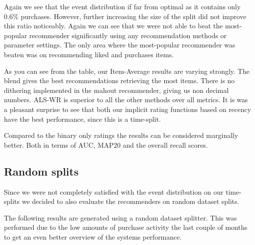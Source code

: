
Again we see that the event distribution if far from optimal as it contains only 0.6\% purchases. However, further increasing the size of the split did not improve this ratio noticeably.
Again we can see that we were not able to beat the most-popular recommender significantly using any recommendation methods or parameter settings. The only area where the most-popular recommender
was beaten was on recommending liked and purchases items.


As you can see from the table, our Item-Average results are varying strongly. The blend gives the best recommendations retrieving the most items.
There is no dithering implemented in the mahout recommender, giving us non decimal numbers. ALS-WR is superior to all the other methods over all metrics.
It is was a pleasant surprise to see that both our implicit rating functions based on recency have the best performance, since this is a time-split.

Compared to the binary only ratings the results can be considered marginally better. Both in terms of AUC, MAP\@20 and the overall recall scores.


\subsection{Random splits}

Since we were not completely satisfied with the event distribution on our time-splits we decided to also evaluate the recommenders on random dataset splits.

The following results are generated using a random dataset splitter. This was performed due to the low amounts of purchase activity the last couple of months to get an even better
overview of the systems performance.

